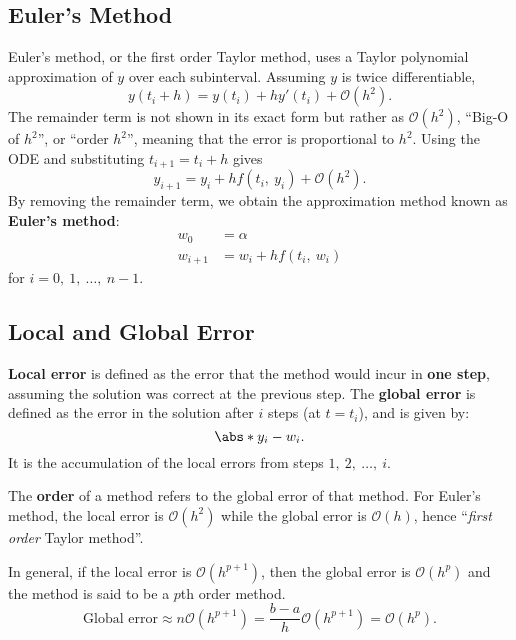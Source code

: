 \documentclass{article}
\begin{document}
\subsection{Euler's Method}
Euler's method, or the first order Taylor method, uses a Taylor polynomial approximation of \(y\) over each subinterval.
Assuming \(y\) is twice differentiable,
\begin{equation*}
    y\left( t_i + h \right) = y\left( t_i \right) + h y'\left( t_i \right) + \mathcal{O}\left( h^2 \right).
\end{equation*}
The remainder term is not shown in its exact form but rather as \(\mathcal{O}\left( h^2 \right)\), ``Big-O of \(h^2\)'', or ``order \(h^2\)'', meaning that
the error is proportional to \(h^2\). Using the ODE and substituting \(t_{i + 1} = t_i + h\) gives
\begin{equation*}
    y_{i + 1} = y_i + h f\left( t_i,\: y_i \right) + \mathcal{O}\left( h^2 \right).
\end{equation*}
By removing the remainder term, we obtain the approximation method known as \textbf{Euler's method}:
\begin{align*}
    w_0       & = \alpha                             \\
    w_{i + 1} & = w_i + h f\left( t_i,\: w_i \right)
\end{align*}
for \(i = 0,\: 1,\: \ldots,\: n - 1\).
\subsection{Local and Global Error}
\textbf{Local error} is defined as the error that the method would incur in \textbf{one step},
assuming the solution was correct at the previous step.
The \textbf{global error} is defined as the error in the solution after \(i\) steps (at \(t = t_i\)),
and is given by:
\begin{equation*}
    \abs*{y_i - w_i}.
\end{equation*}
It is the accumulation of the local errors from steps \(1,\: 2,\: \ldots,\: i\).

The \textbf{order} of a method refers to the global error of that method. For Euler's
method, the local error is \(\mathcal{O}\left( h^2 \right)\) while the global error is
\(\mathcal{O}\left( h \right)\), hence ``\textit{first order} Taylor method''.

In general, if the local error is \(\mathcal{O}\left( h^{p + 1} \right)\), then the global error is
\(\mathcal{O}\left( h^p \right)\) and the method is said to be a \(p\)th order method.
\begin{equation*}
    \text{Global error} \approx n \mathcal{O}\left( h^{p + 1} \right) = \frac{b - a}{h} \mathcal{O}\left( h^{p + 1} \right) = \mathcal{O}\left( h^p \right).
\end{equation*}
\end{document}
